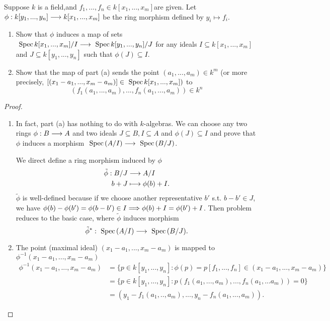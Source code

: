 \begin{exr}
Suppose $k$ is a field,and $f_1,...,f_n \in k[x_1,...,x_m]$are given. Let $\phi: k[y_1,...,y_n] \longrightarrow k[x_1,...,x_m]$ be the ring morphism defined by $y_i  \mapsto f_i$.
\begin{enumerate}[label=(\alph*)]
\item  Show that $\phi$ induces a map of sets $\text{ Spec\,} k[x_1,...,x_m]/I \longrightarrow \text{ Spec\,} k[y_1,...,y_n]/J$ for any ideals $I \subseteq k[x_1,...,x_m]$ and $J \subseteq k[y_1,...,y_n]$ such that $\phi(J) \subseteq I$. 
\item Show that the map of part (a) sends the point $(a_1,...,a_m) \in k^m$ (or more
precisely, $[(x_1 -a_1,...,x_m - a_m)] \in \text{ Spec\,} k[x_1,...,x_m])$ to
$$
(f_1(a_1,...,a_m),...,f_n(a_1,...,a_m)) \in k^n
$$
\end{enumerate}
\end{exr}
\begin{proof}
\begin{enumerate}[label=(\alph*)]
\item In fact, part (a) has nothing to do with $k$-algebras. We can choose any two rings $\phi:B\longrightarrow A$ and two ideals $J\subseteq B, I\subseteq A$ and $\phi(J)\subseteq I$ and prove that $\phi$ induces a morphism $\text{ Spec\,} (A/I)\longrightarrow \text{ Spec\,} (B/J)$. 

We direct define a ring morphism induced by $\phi$
$$
\begin{aligned}
\tilde{\phi}:B/J&\longrightarrow A/I\\
b+J&\longmapsto \phi(b)+I.
\end{aligned}
$$
$\tilde{\phi}$ is well-defined because if we choose another representative $b'$ s.t. $b-b'\in J$, we have $\phi(b)-\phi(b')=\phi(b-b')\in I\Longrightarrow \phi(b)+I=\phi(b')+I$. Then problem reduces to the basic case, where $\tilde{\phi}$ induces morphism
$$
\tilde{\phi}^*:\text{ Spec\,}(A/I)\longrightarrow \text{ Spec\,} (B/J).
$$
\item The point (maximal ideal) $(x_1-a_1,...,x_m-a_m)$  is mapped to $\phi^{-1}(x_1-a_1,...,x_m-a_m)$
$$
\begin{aligned}
\phi^{-1}(x_1-a_1,...,x_m-a_m)&=\{p\in k[y_1,...,y_n]:\phi(p)=p[f_1,...,f_n]\in (x_1-a_1,...,x_m-a_m)\}\\
&=\{p\in k[y_1,...,y_n]: p\left(f_1(a_1,...,a_m),...,f_n(a_1,...a_m)\right)=0\}\\
&=(y_1-f_1(a_1,..,a_m),...,y_n-f_n(a_1,...,a_m)).
\end{aligned}
$$ 
\end{enumerate}
\end{proof}

